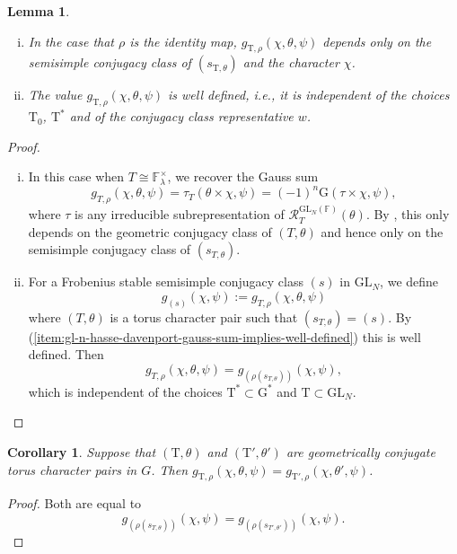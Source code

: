\documentclass[12pt, reqno]{amsart}
\newtheorem{lemma}[theorem]{Lemma}
\newtheorem{corollary}[theorem]{Corollary}
\theoremstyle{definition}
\theoremstyle{definition}
\theoremstyle{definition}
\newcommand{\multiplicativegroup}[1]{#1^{\times}}
\newcommand{\fieldCharacter}{\psi}
\newcommand{\GL}{\mathrm{GL}}
\newcommand{\finiteField}{\mathbb{F}}
\newcommand{\finiteFieldExtension}[1]{\finiteField_{#1}}
\newcommand{\GaussSumScalar}[2]{\mathrm{G}\left(#1, #2\right)}
\newcommand{\GaussSumTorusCharacter}[4]{\tau_{#1}\left(#2 \times #3, #4\right)}
\newcommand{\algebraicGroup}[1]{\boldsymbol{\mathrm{#1}}}
\newcommand{\RTThetaVirtual}[3]{\mathcal{R}_{#1}^{#2}(#3)}
\begin{document}
\begin{lemma}
\label{lemma:gl_invariance}
\begin{enumerate}[(i)]
	\item \label{item:gl-n-hasse-davenport-gauss-sum-implies-well-defined} In the case that $\rho$ is the identity map, $g_{\algebraicGroup{T},\rho}(\chi,\theta,\psi)$ depends only on the semisimple conjugacy class of $(s_{\algebraicGroup{T},\theta})$ and the character $\chi$.
	\item The value $g_{\algebraicGroup{T},\rho}(\chi,\theta,\psi)$ is well defined, i.e., it is independent of the choices $\algebraicGroup{T}_0$, $\algebraicGroup{T}^*$ and of the conjugacy class representative $w$.
\end{enumerate}
\end{lemma}
\begin{proof}
\begin{enumerate}[(i)]
	\item In this case when $T \cong \multiplicativegroup{\finiteFieldExtension{\lambda}}$, we recover the Gauss sum
	\[
	g_{T,\rho}(\chi,\theta,\psi) = \GaussSumTorusCharacter{T}{\theta}{\chi}{\fieldCharacter} = \left(-1\right)^n \GaussSumScalar{\tau \times \chi}{\fieldCharacter},
	\]
	where $\tau$ is any irreducible subrepresentation of $\RTThetaVirtual{T}{\GL_N\left(\finiteField\right)}{\theta}$. By , this only depends on the geometric conjugacy class of $(T,\theta)$ and hence only on the semisimple conjugacy class of $(s_{T,\theta})$.
	\item For a Frobenius stable semisimple conjugacy class $(s)$ in $\GL_N$, we define
	$$
	g_{(s)}(\chi,\fieldCharacter) := g_{T,\rho}(\chi,\theta,\fieldCharacter)$$
	where $(T,\theta)$ is a torus character pair such that $\left(s_{T,\theta}\right) = (s)$.
	By (\ref{item:gl-n-hasse-davenport-gauss-sum-implies-well-defined}) this is well defined. Then
	$$
	g_{T,\rho}(\chi,\theta,\fieldCharacter)  = g_{(\rho(s_{T,\theta}))}(\chi,\fieldCharacter),
	$$
	which is independent of the choices $\algebraicGroup{T}^* \subset \algebraicGroup{G}^*$ and $\algebraicGroup{T} \subset \algebraicGroup{\GL}_N$.
\end{enumerate}
\end{proof}


\begin{corollary}
\label{cor:geoconj}
Suppose that $(\algebraicGroup{T},\theta)$ and $(\algebraicGroup{T}',\theta')$ are geometrically conjugate torus character pairs in $G$. Then $g_{\algebraicGroup{T},\rho}(\chi,\theta,\psi) = g_{\algebraicGroup{T}',\rho}(\chi,\theta',\psi)$.
\end{corollary}
\begin{proof}
Both are equal to $$g_{(\rho(s_{T,\theta}))}\left(\chi, \fieldCharacter\right) = g_{(\rho(s_{T',\theta'}))}\left(\chi, \fieldCharacter\right).$$
\end{proof}
\end{document}
